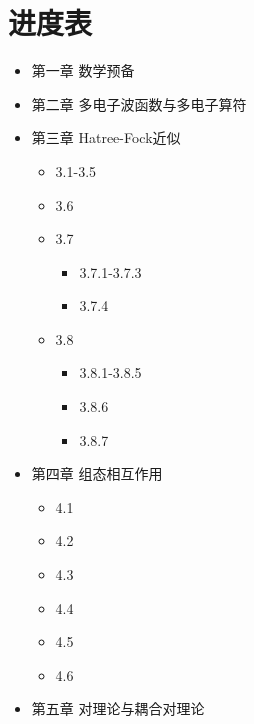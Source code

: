 \chapter*{进度表}

\makeatletter
\@date
\makeatother

\begin{itemize}
    \item[\CheckedBox] 第一章  数学预备
    \item[\CheckedBox] 第二章  多电子波函数与多电子算符
    \item[\DSquare] 第三章  Hatree-Fock近似 
    	\begin{itemize}
		    \item[\CheckedBox] 3.1-3.5
		    \item[\CheckedBox] 3.6 
		    \item[\DSquare] 3.7
		        \begin{itemize}
					\item [\DSquare] 3.7.1-3.7.3
					\item [\Square] 3.7.4
				\end{itemize}
		    \item[\DSquare] 3.8 
			   \begin{itemize}
				     \item[\CheckedBox] 3.8.1-3.8.5
				     \item[\Square] 3.8.6
				     \item[\DSquare] 3.8.7
			   \end{itemize}
    	\end{itemize}
    \item[\DSquare] 
    	第四章 组态相互作用 
	    \begin{itemize}
	        \item[\DSquare] 4.1
	        \item[\CheckedBox] 4.2
			\item[\Square] 4.3
	        \item[\CheckedBox] 4.4
	        \item[\DSquare] 4.5
		\item[\Square] 4.6
	    \end{itemize}
    \item[\DSquare] 第五章 对理论与耦合对理论 

\end{itemize}
